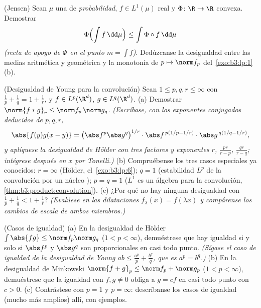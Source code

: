 \begin{exercise}[$\star\star$]\label{exo:b3:lp:10}
(Jensen) Sean $\mu$ una  de
\emph{probabilidad}, $f \in
L^1(\mu)$ real y $\Phi \colon \R \to \R$ convexa. Demostrar
\[
\Phi\Bigl(\int f\,\dd\mu\Bigr) \leq \int \Phi\circ
f\,\dd\mu
\]
\emph{(recta de apoyo de $\Phi$ en el punto $m = \int f$)}. Dedúzcanse
la desigualdad entre las medias aritmética y geométrica y la monotonía
de $p \mapsto \norm f_p$ del~\cref{exo:b3:lp:1}(b).
\end{exercise}

\begin{exercise}[$\star\star\star$]\label{exo:b3:lp:11}
(Desigualdad de Young para la convolución) Sean $1 \leq p, q, r \leq
\infty$ con $\frac1p + \frac1q = 1 + \frac1r$, y $f \in
L^p(\R^d)$, $g \in L^q(\R^d)$. (a) Demostrar
$\norm{f * g}_r \leq \norm f_p\,\norm g_q$. \emph{(Escríbase, con los
exponentes conjugados deducidos de $p, q,
r$,
\[
\abs{f(y)g(x-y)} = \bigl(\abs f^p\abs g^q\bigr)^{1/r}
\cdot\abs f^{\,p(1/p - 1/r)}\cdot\abs g^{\,q(1/q - 1/r)},
\]
y aplíquese la desigualdad de Hölder con tres factores y exponentes $r$,
$\frac{pr}{r - p}$, $\frac{qr}{r - q}$; intégrese después en $x$ por
Tonelli.)} (b) Compruébense los tres casos especiales ya conocidos: $r =
\infty$ (Hölder, el~\cref{exo:b3:lp:6}); $q = 1$ (estabilidad $L^p$ de
la convolución por un núcleo );
$p = q = 1$ ($L^1$ es un álgebra para la convolución,
\cref{thm:b3:product:convolution}).
(c) ¿Por qué no hay ninguna desigualdad con $\frac1p + \frac1q < 1 +
\frac1r$? \emph{(Evalúese en las dilataciones $f_\lambda(x) =
f(\lambda x)$ y compárense los cambios de escala de ambos miembros.)}
\end{exercise}

\begin{exercise}[$\star\star$]\label{exo:b3:lp:12}
(Casos de igualdad) (a) En la desigualdad de Hölder
$\int\abs{fg} \leq \norm f_p\norm g_q$ ($1 < p < \infty$),
demuéstrese que hay igualdad si y solo si $\abs f^p$ y $\abs g^q$ son
proporcionales en casi todo punto. \emph{(Sígase el caso de igualdad de
la desigualdad de Young $ab \leq \frac{a^p}p + \frac{b^q}q$, que es $a^p
= b^q$.)} (b) En la desigualdad de Minkowski
$\norm{f + g}_p \leq \norm f_p
+ \norm g_p$ ($1 < p < \infty$), demuéstrese que la igualdad con $f,
g \neq 0$ obliga a $g = cf$ en casi todo punto con $c > 0$. (c)
Contrástese con $p = 1$ y $p = \infty$: descríbanse los casos de
igualdad (mucho más amplios) allí, con ejemplos.
\end{exercise}

